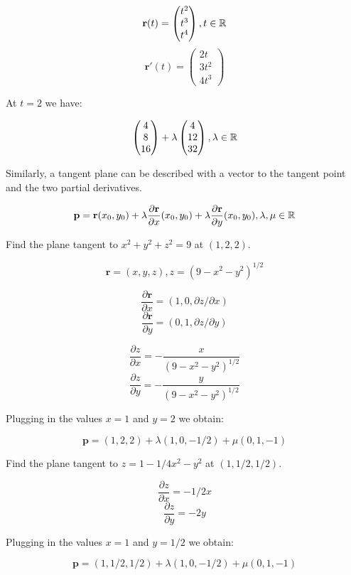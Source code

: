 \documentclass[a4paper,10pt]{article}
\begin{document}
\begin{ex}
	\[
		\mathbf{r}(t) =
		\begin{pmatrix}
			t^2 \\ t^3 \\ t^4
		\end{pmatrix}
		, t \in \mathbb{R}
	\]
	\[
		\mathbf{r}'(t) =
		\begin{pmatrix}
			2t \\ 3t^2 \\ 4t^3
		\end{pmatrix}
	\]

	At $t=2$ we have:

	\[
		\begin{pmatrix}
			4 \\ 8 \\ 16
		\end{pmatrix}
		+ \lambda
		\begin{pmatrix}
			4 \\ 12 \\ 32
		\end{pmatrix}
		, \lambda \in \mathbb{R}
	\]
\end{ex}

Similarly, a tangent plane can be described with a vector to the tangent point
and the two partial derivatives.

\[ \mathbf{p} = \mathbf{r}(x_0, y_0)
+ \lambda \frac{\partial \mathbf{r}}{\partial x}(x_0, y_0)
+ \lambda \frac{\partial \mathbf{r}}{\partial y}(x_0, y_0)
, \lambda, \mu \in \mathbb{R} \]

\begin{ex}
	Find the plane tangent to $x^2 + y^2 + z^2 = 9$ at $(1,2,2)$.

	\[ \mathbf{r} = (x,y,z), z = {(9 - x^2 - y^2)}^{1/2} \]

	\[ \frac{\partial \mathbf{r}}{\partial x} = (1, 0, \partial z /
	\partial x) \]
	\[ \frac{\partial \mathbf{r}}{\partial y} = (0, 1, \partial z /
	\partial y) \]

	\[ \frac{\partial z}{\partial x} = - \frac{x}{{(9-x^2-y^2)}^{1/2}} \]
	\[ \frac{\partial z}{\partial y} = - \frac{y}{{(9-x^2-y^2)}^{1/2}} \]

	Plugging in the values $x=1$ and $y=2$ we obtain:

	\[ \mathbf{p} = (1,2,2) + \lambda (1, 0, -1/2) + \mu (0, 1, -1) \]
\end{ex}

\begin{ex}
	Find the plane tangent to $z = 1 - 1/4 x^2 - y^2$ at $(1,1/2,1/2)$.

	\[ \frac{\partial z}{\partial x} = -1/2 x \]
	\[ \frac{\partial z}{\partial y} = -2y \]

	Plugging in the values $x=1$ and $y=1/2$ we obtain:

	\[ \mathbf{p} = (1,1/2,1/2) + \lambda (1, 0, -1/2) + \mu (0, 1, -1) \]
\end{ex}
\end{document}
